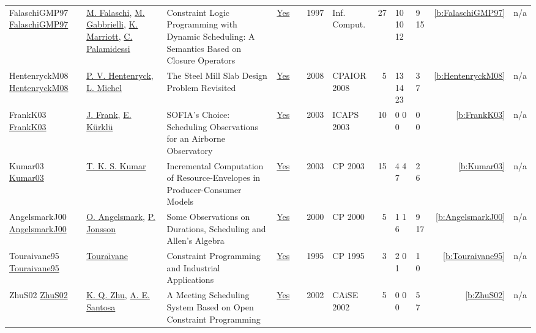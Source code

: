 {\begin{longtable}{>{\raggedright\arraybackslash}p{3cm}>{\raggedright\arraybackslash}p{4.5cm}>{\raggedright\arraybackslash}p{6.0cm}rrrp{2.5cm}rp{1cm}p{1cm}rr}
FalaschiGMP97 \href{https://doi.org/10.1006/inco.1997.2638}{FalaschiGMP97} & \hyperref[auth:a687]{M. Falaschi}, \hyperref[auth:a192]{M. Gabbrielli}, \hyperref[auth:a688]{K. Marriott}, \hyperref[auth:a689]{C. Palamidessi} & \cellcolor{gold!20}Constraint Logic Programming with Dynamic Scheduling: {A} Semantics Based on Closure Operators & \href{../works/FalaschiGMP97.pdf}{Yes} & \cite{FalaschiGMP97} & 1997 & Inf. Comput. & 27 & 10 10 12 & 9 15 & \ref{b:FalaschiGMP97} & n/a\\
HentenryckM08 \href{https://doi.org/10.1007/978-3-540-68155-7_41}{HentenryckM08} & \hyperref[auth:a148]{P. V. Hentenryck}, \hyperref[auth:a32]{L. Michel} & The Steel Mill Slab Design Problem Revisited & \href{../works/HentenryckM08.pdf}{Yes} & \cite{HentenryckM08} & 2008 & CPAIOR 2008 & 5 & 13 14 23 & 3 7 & \ref{b:HentenryckM08} & n/a\\
FrankK03 \href{http://www.aaai.org/Library/ICAPS/2003/icaps03-023.php}{FrankK03} & \hyperref[auth:a379]{J. Frank}, \hyperref[auth:a380]{E. K{\"{u}}rkl{\"{u}}} & SOFIA's Choice: Scheduling Observations for an Airborne Observatory & \href{../works/FrankK03.pdf}{Yes} & \cite{FrankK03} & 2003 & ICAPS 2003 & 10 & 0 0 0 & 0 0 & \ref{b:FrankK03} & n/a\\
Kumar03 \href{https://doi.org/10.1007/978-3-540-45193-8_45}{Kumar03} & \hyperref[auth:a286]{T. K. S. Kumar} & Incremental Computation of Resource-Envelopes in Producer-Consumer Models & \href{../works/Kumar03.pdf}{Yes} & \cite{Kumar03} & 2003 & CP 2003 & 15 & 4 4 7 & 2 6 & \ref{b:Kumar03} & n/a\\
AngelsmarkJ00 \href{https://doi.org/10.1007/3-540-45349-0_35}{AngelsmarkJ00} & \hyperref[auth:a295]{O. Angelsmark}, \hyperref[auth:a296]{P. Jonsson} & Some Observations on Durations, Scheduling and Allen's Algebra & \href{../works/AngelsmarkJ00.pdf}{Yes} & \cite{AngelsmarkJ00} & 2000 & CP 2000 & 5 & 1 1 6 & 9 17 & \ref{b:AngelsmarkJ00} & n/a\\
Touraivane95 \href{https://doi.org/10.1007/3-540-60299-2_41}{Touraivane95} & \hyperref[auth:a306]{Toura{\"{\i}}vane} & Constraint Programming and Industrial Applications & \href{../works/Touraivane95.pdf}{Yes} & \cite{Touraivane95} & 1995 & CP 1995 & 3 & 2 0 1 & 1 0 & \ref{b:Touraivane95} & n/a\\
ZhuS02 \href{https://doi.org/10.1007/3-540-47961-9_69}{ZhuS02} & \hyperref[auth:a674]{K. Q. Zhu}, \hyperref[auth:a675]{A. E. Santosa} & A Meeting Scheduling System Based on Open Constraint Programming & \href{../works/ZhuS02.pdf}{Yes} & \cite{ZhuS02} & 2002 & CAiSE 2002 & 5 & 0 0 0 & 5 7 & \ref{b:ZhuS02} & n/a\\

\end{longtable}}
